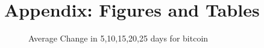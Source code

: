 \documentclass[12pt,a4paper]{article}
\begin{document}
\newpage
\appendix
\addtocounter{page}{-1}
\thispagestyle{empty}

\section*{Appendix: Figures and Tables}
\label{sec:AppendixFT}

\begin{figure}[H]
	\caption{ Average Change in 5,10,15,20,25 days for bitcoin}
	\label{figure:bitcoin_ac}
\end{figure}
\end{document}
